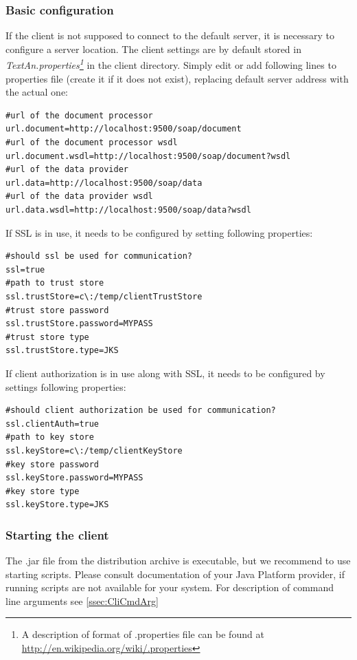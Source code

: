 \documentclass[12pt,a4paper]{report}
\begin{document}
\subsubsection{Basic configuration}

If the client is not supposed to connect to the default server, it is necessary
to configure a server location. The client settings are by default stored in \emph{TextAn.properties\footnote{A description of format of .properties file can be found at \url{http://en.wikipedia.org/wiki/.properties}}}
in the client directory. Simply edit or add following lines to properties file
(create it if it does not exist), replacing default server address with the
actual one:
\begin{lstlisting}[frame=single,language=properties]
#url of the document processor
url.document=http://localhost:9500/soap/document
#url of the document processor wsdl
url.document.wsdl=http://localhost:9500/soap/document?wsdl
#url of the data provider
url.data=http://localhost:9500/soap/data
#url of the data provider wsdl
url.data.wsdl=http://localhost:9500/soap/data?wsdl
\end{lstlisting}

If SSL is in use, it needs to be configured by setting following properties:
\begin{lstlisting}[frame=single,language=properties]
#should ssl be used for communication?
ssl=true
#path to trust store
ssl.trustStore=c\:/temp/clientTrustStore
#trust store password
ssl.trustStore.password=MYPASS
#trust store type
ssl.trustStore.type=JKS
\end{lstlisting}

If client authorization is in use along with SSL, it needs to be configured
by settings following properties:
\begin{lstlisting}[frame=single,language=properties]
#should client authorization be used for communication?
ssl.clientAuth=true
#path to key store
ssl.keyStore=c\:/temp/clientKeyStore
#key store password
ssl.keyStore.password=MYPASS
#key store type
ssl.keyStore.type=JKS
\end{lstlisting}

\subsubsection{Starting the client}
\label{sssec:StartClient}

The .jar file from the distribution archive is executable,
but we recommend to use starting scripts.
Please consult documentation of your Java Platform provider,
if running scripts are not available for your system.
For description of command line arguments see \ref{ssec:CliCmdArg}
\end{document}
